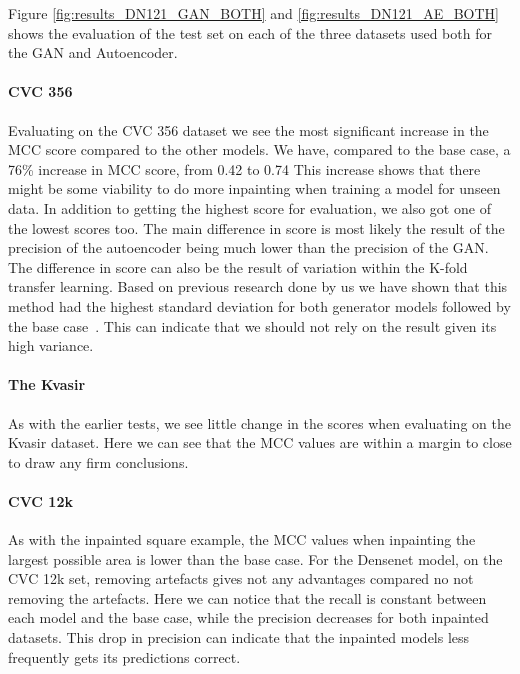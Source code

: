 %
Figure \ref{fig:results_DN121_GAN_BOTH} and \ref{fig:results_DN121_AE_BOTH} shows the evaluation of the test set on each of the three datasets used both for the GAN and Autoencoder. 

\paragraph{CVC 356}
Evaluating on the CVC 356 dataset we see the most significant increase in the MCC score compared to the other models. 
We have, compared to the base case, a 76\% increase in MCC score, from 0.42 to 0.74
This increase shows that there might be some viability to do more inpainting when training a model for unseen data.
In addition to getting the highest score for evaluation, we also got one of the lowest scores too. 
The main difference in score is most likely the result of the precision of the autoencoder being much lower than the precision of the GAN.
The difference in score can also be the result of variation within the K-fold transfer learning.
Based on previous research done by us we have shown that this method had the highest standard deviation for both generator models followed by the base case~\cite{Mathias2019IEEpaper}. This can indicate that we should not rely on the result given its high variance. 



\paragraph{The Kvasir}
As with the earlier tests, we see little change in the scores when evaluating on the Kvasir dataset. Here we can see that the MCC values are within a margin to close to draw any firm conclusions.



\paragraph{CVC 12k}
As with the inpainted square example, the MCC values when inpainting the largest possible area is lower than the base case.  For the Densenet model, on the CVC 12k set, removing artefacts gives not any advantages compared no not removing the artefacts. 
Here we can notice that the recall is constant between each model and the base case, while the precision decreases for both inpainted datasets. This drop in precision can indicate that the inpainted models less frequently gets its predictions correct. 


































